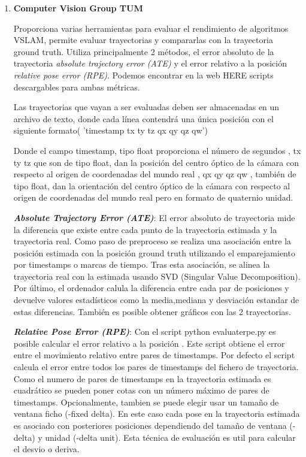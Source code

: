 \begin {enumerate}
\item\textbf{Computer Vision Group TUM}

Proporciona varias herramientas para evaluar el rendimiento de algoritmos VSLAM, permite evaluar trayectorias y compararlas con la trayectoria ground truth.\cite{sturm12iros}
Utiliza principalmente 2 métodos, el error absoluto de la trayectoria \textit{absolute trajectory error (ATE)} y el error relativo a la posición \textit{relative pose error (RPE)}. Podemos encontrar en la web HERE scripts descargables para ambas métricas.

Las trayectorias que vayan a ser evaluadas deben ser almacenadas en un archivo de texto, donde cada línea contendrá una única posición con el siguiente formato( 'timestamp tx ty tz qx qy qz qw')

Donde el campo timestamp, tipo float proporciona el número de segundos , tx ty tz que son de tipo float, dan la posición del centro óptico de la cámara con respecto al origen de coordenadas del mundo real , qx qy qz qw , también de tipo float, dan la orientación del centro óptico de la cámara  con respecto al origen de coordenadas del mundo real pero en formato de quaternio unidad.


 \textbf{\textit{Absolute Trajectory Error (ATE)}}:
 El error absoluto de trayectoria mide la diferencia que existe entre cada punto de la trayectoria estimada y la trayectoria real. Como paso de preproceso se realiza una asociación entre la posición estimada con la posición ground truth utilizando el emparejamiento por timestamps o marcas de tiempo. Tras esta asociación, se alinea la trayectoria real con la estimada usando SVD (Singular Value Decomposition). Por último, el ordenador calula la diferencia entre cada par de posiciones y devuelve valores estadísticos como la media,mediana y desviación estandar de estas diferencias. También es posible obtener gráficos con las 2 trayectorias.

\textbf{\textit{Relative Pose Error (RPE)}}: 
Con el script python evaluaterpe.py es posible calcular el error relativo a la posición . Este script obtiene el error entre el movimiento relativo entre pares de timestamps. Por defecto el script calcula el error entre todos los pares de timestamps del fichero de trayectoria. Como el numero de pares de timestamps en la trayectoria estimada es cuadrático se pueden poner cotas con un número máximo de pares de timestamps. Opcionalmente, tambien se puede elegir usar un tamaño de ventana ficho (-fixed delta). En este caso cada pose en la trayectoria estimada es asociado con posteriores posiciones dependiendo del tamaño de ventana (-delta) y unidad (-delta unit). Esta técnica de evaluación es util para calcular el desvio o deriva.




\end{enumerate}
